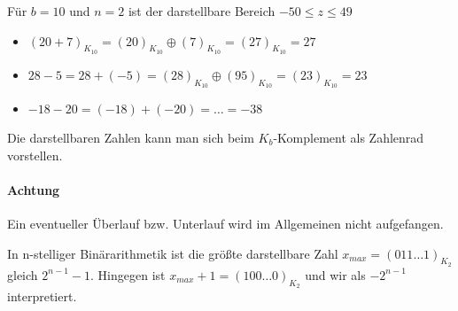 \begin{example}
Für $b=10$ und $n=2$ ist der darstellbare Bereich $-50 \le  z \le 49$
\begin{itemize}
	\item $(20+7)_{K_{10}} = (20)_{K_{10}} \oplus (7)_{K_{10}} =(27)_{K_{10}}=27$
	\item $28-5 = 28+ (-5)= (28)_{K_{10}} \oplus (95)_{K_{10}} = (23)_{K_{10}} =23 $
	\item $-18-20= (-18)+(-20) = \ldots = -38$
\end{itemize}
\end{example}
Die darstellbaren Zahlen kann man sich beim $K_b$-Komplement als Zahlenrad vorstellen.


\paragraph{Achtung} Ein eventueller Überlauf bzw. Unterlauf wird im Allgemeinen nicht aufgefangen.
\begin{example}
In n-stelliger Binärarithmetik ist die größte darstellbare Zahl $x_{max} = (011\ldots 1)_{K_2}$ gleich  $2^{n-1}-1$. Hingegen ist $x_{max}+1=(100\ldots 0)_{K_2}$ und wir als $-2^{n-1}$ interpretiert.
\end{example}
